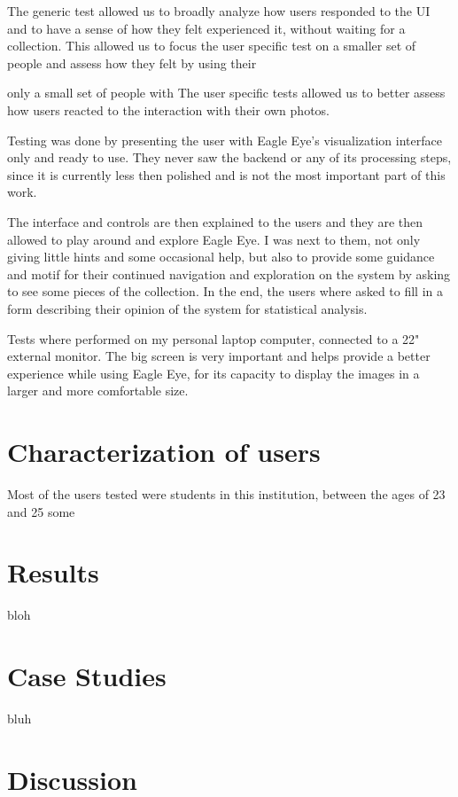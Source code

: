 The generic test allowed us to broadly analyze how users responded to the \ac{UI} and to have a sense of how they felt experienced it, without waiting for a collection. This allowed us to focus the user specific test on a smaller set of people and assess how they felt by using their 


 only a small set of people with  The user specific tests allowed us to  better assess how users reacted to the interaction with their own photos.

Testing was done by presenting the user with Eagle Eye's visualization interface only and ready to use. They never saw the backend or any of its processing steps, since it is currently less then polished and is not the most important part of this work. 

The interface and controls are then explained to the users and they are then allowed to play around and explore Eagle Eye. I was next to them, not only giving little hints and some occasional help, but also to provide some guidance and motif for their continued navigation and exploration on the system by asking to see some pieces of the collection. In the end, the users where asked to fill in a form describing their opinion of the system for statistical analysis.

Tests where performed on my personal laptop computer, connected to a 22" external monitor. The big screen is very important and helps provide a better experience while using Eagle Eye, for its capacity to display the images in a larger and more comfortable size.


\section{Characterization of users}

Most of the users tested were students in this institution, between the ages of 23 and 25 some  

\section{Results}

bloh

\section{Case Studies}

bluh

\section{Discussion}

